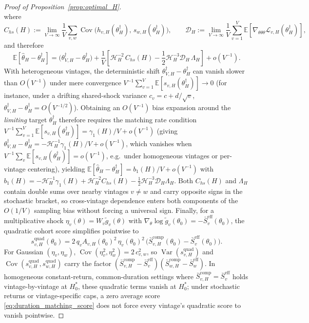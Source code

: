 \begin{proof}[Proof of Proposition~\ref{prop:optimal_H}]
\[\]
where
\[
C_{hs}(H) := \lim_{V\to\infty}\frac{1}{V}\sum_{v,w}\operatorname{Cov}\!\bigl(h_{v,H}(\theta_H^\dagger),\, s_{w,H}(\theta_H^\dagger)\bigr),
\qquad
\mathcal{D}_H := \lim_{V\to\infty}\frac{1}{V}\sum_{v=1}^V \mathbb{E}\!\left[\nabla_{\theta\theta\theta}\mathcal{L}_{v,H}(\theta_H^\dagger)\right],
\]
and therefore
\[
\mathbb{E}\!\left[\hat\theta_H - \theta_H^\dagger\right]
= \bigl(\theta_{V,H}^\dagger - \theta_H^\dagger\bigr)
+ \frac{1}{V}\left[\mathcal{H}_H^{-2}\,C_{hs}(H) - \frac{1}{2}\mathcal{H}_H^{-3}\mathcal{D}_H\,\Lambda_H\right] + o(V^{-1}).
\]
With heterogeneous vintages, the deterministic shift $\theta_{V,H}^\dagger - \theta_H^\dagger$ can vanish slower than $O(V^{-1})$ under mere convergence $V^{-1}\sum_{v=1}^V \mathbb{E}[s_{v,H}(\theta_H^\dagger)] \to 0$ (for instance, under a drifting shared-shock variance $c_v = c + d/\sqrt{v}$, $\theta_{V,H}^\dagger - \theta_H^\dagger = O(V^{-1/2})$). Obtaining an $O(V^{-1})$ bias expansion around the \emph{limiting} target $\theta_H^\dagger$ therefore requires the matching rate condition $V^{-1}\sum_{v=1}^V \mathbb{E}[s_{v,H}(\theta_H^\dagger)] = \gamma_1(H)/V + o(V^{-1})$ (giving $\theta_{V,H}^\dagger - \theta_H^\dagger = -\mathcal{H}_H^{-1}\gamma_1(H)/V + o(V^{-1})$, which vanishes when $V^{-1}\sum_v\mathbb{E}[s_{v,H}(\theta_H^\dagger)] = o(V^{-1})$, e.g.\ under homogeneous vintages or per-vintage centering), yielding $\mathbb{E}[\hat\theta_H - \theta_H^\dagger] = b_1(H)/V + o(V^{-1})$ with $b_1(H) = -\mathcal{H}_H^{-1}\gamma_1(H) + \mathcal{H}_H^{-2}C_{hs}(H) - \frac{1}{2}\mathcal{H}_H^{-3}\mathcal{D}_H\Lambda_H$. Both $C_{hs}(H)$ and $\Lambda_H$ contain double sums over nearby vintages $v \neq w$ and carry opposite signs in the stochastic bracket, so cross-vintage dependence enters both components of the $O(1/V)$ sampling bias without forcing a universal sign.
Finally, for a multiplicative shock $\eta_v(\theta) = W_v \tilde{g}_v(\theta)$ with $\nabla_\theta\log\tilde{g}_v(\theta_0) = -\bar{S}_v^{\mathrm{eff}}(\theta_0)$, the quadratic cohort score simplifies pointwise to
\[
s_{v,H}^{\mathrm{quad}}(\theta_0) = 2\,q_v A_{v,H}(\theta_0)^2\,\eta_v(\theta_0)^2\,\Big(\bar{S}_{v,H}^{\mathrm{comp}}(\theta_0) - \bar{S}_v^{\mathrm{eff}}(\theta_0)\Big).
\]
For Gaussian $(\eta_v,\eta_w)$, $\operatorname{Cov}(\eta_v^2,\eta_w^2) = 2\,c_{v,w}^2$, so $\operatorname{Var}(s_{v,H}^{\mathrm{quad}})$ and $\operatorname{Cov}(s_{v,H}^{\mathrm{quad}}, s_{w,H}^{\mathrm{quad}})$ carry the factor $(\bar{S}_{v,H}^{\mathrm{comp}} - \bar{S}_v^{\mathrm{eff}})(\bar{S}_{w,H}^{\mathrm{comp}} - \bar{S}_w^{\mathrm{eff}})$. In homogeneous constant-return, common-duration settings where $\bar{S}_{v,H}^{\mathrm{comp}} = \bar{S}_v^{\mathrm{eff}}$ holds vintage-by-vintage at $H_0^\ast$, these quadratic terms vanish at $H_0^\ast$; under stochastic returns or vintage-specific caps, a zero average score \eqref{eq:duration_matching_score} does not force every vintage's quadratic score to vanish pointwise.


\end{proof}
